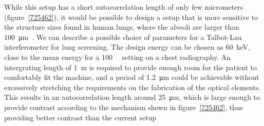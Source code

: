 While this setup has a short autocorrelation length of only few micrometers
(figure~\ref{725462}), it would be possible to design a setup that is more
sensitive to the structure sizes found in human lungs, where the alveoli are
larger than
\SI{100}{\micro\meter}~\cite{Ochs_2004}. We can describe a
possible choice of parameters for a Talbot-Lau interferometer for lung
screening. The design energy can be chosen as \SI{60}{\kilo\eV}, close to
the mean energy for a \SI{100}{\kilo\voltpeak} setting on a chest
radiography. An intergrating length of \SI{1}{\meter} is required to provide
enough room for the patient to comfortably fit the machine,
and a period of \SI{1.2}{\micro\meter} could be achievable without
excessively stretching the requirements on the fabrication of the optical
elements. This results in an autocorrelation length around
\SI{25}{\micro\meter}, which is large enough to provide contrast according
to the mechanism shown in figure~\ref{725462}, thus providing better contrast than the
current setup